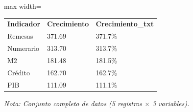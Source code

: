 

\begin{table}[htbp]

\centering

\begin{adjustbox}{max width=\textwidth}

\begin{tabular}{lll}

\rowcolor{ThemeBackground}
\rule{0pt}{0.45cm}
\textcolor{ThemeGold}{\bfseries Indicador} & \textcolor{ThemeGold}{\bfseries Crecimiento} & \textcolor{ThemeGold}{\bfseries Crecimiento\_txt} \\

Remesas & 371.69 & 371.7\% \\
Numerario & 313.70 & 313.7\% \\
M2 & 181.48 & 181.5\% \\
Crédito & 162.70 & 162.7\% \\
PIB & 111.09 & 111.1\% \\
\bottomrule
\end{tabular}

\end{adjustbox}

\vspace{0.15cm}
{\raggedright\sffamily\footnotesize\color{ThemeMuted}
\textit{Nota: Conjunto completo de datos (5 registros $\times$ 3 variables).}}

\end{table}
